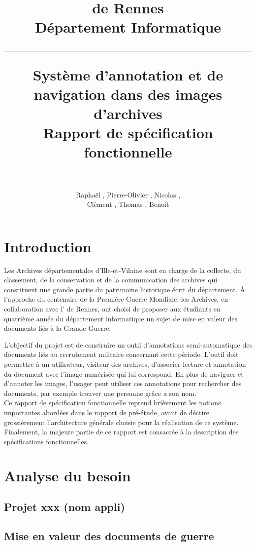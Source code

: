 \documentclass[a4paper]{article}
\title{\bsc{INSA} de Rennes \\ Département Informatique \\ \bigskip \hrule \bigskip Système d'annotation et de navigation dans des images d'archives \\ \bigskip Rapport de spécification fonctionnelle \bigskip \hrule}
\author{Raphaël \bsc{Baron}, Pierre-Olivier \bsc{Bouteau}, Nicolas \bsc{Charpentier}, \\ Clément \bsc{Leboullenger}, Thomas \bsc{François}, Benoit \bsc{Travers}}
\begin{document}
\maketitle
\thispagestyle{empty}

\newpage
\tableofcontents
\thispagestyle{empty}

\newpage
\section*{Introduction}

	Les Archives départementales d'Ille-et-Vilaine sont en charge de la collecte, du classement, de la conservation et de la communication des archives qui constituent une grande partie du patrimoine historique écrit du département. 
\`A l'approche du centenaire de la Première Guerre Mondiale, les Archives, en collaboration avec l' de Rennes, ont choisi de proposer aux étudiants en quatrième année du département informatique un sujet de mise en valeur des documents li\'es \`a la Grande Guerre.

	L'objectif du projet est de construire un outil d'annotations semi-auto\-matique des documents liés au recrutement militaire concernant cette période. L'outil doit permettre à un utilisateur, visiteur des archives, d'associer lecture et annotation du document avec l'image numérisée qui lui correspond. En plus de naviguer et d'annoter les images, l'usager peut utiliser ces annotations pour rechercher des documents, par exemple trouver une personne grâce a son nom.\\
	
	Ce rapport de spécification fonctionnelle reprend brièvement les notions importantes abordées dans le rapport de pré-étude, avant de décrire grossièrement l'architecture générale choisie pour la réalisation de ce système. Finalement, la majeure partie de ce rapport est consacrée à la description des spécifications fonctionnelles.

\newpage

\section{Analyse du besoin}
\subsection{Projet xxx (nom appli)}

\subsection{Mise en valeur des documents de guerre}
\end{document}
